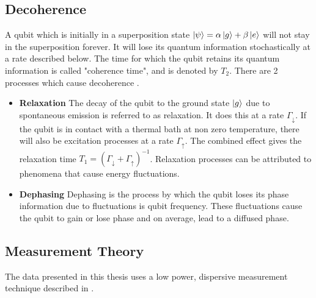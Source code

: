 \subsection{Decoherence}

A qubit which is initially in a superposition state $\ket{\psi} = \alpha\ket{g}+\beta\ket{e}$ will not stay in the superposition forever. It will lose its quantum information stochastically at a rate described below. The time for which the qubit retains its quantum information is called "coherence time", and is denoted by $T_2$. There are 2 processes which cause decoherence \cite{Geerlings2013}.
\begin{itemize}
\item \textbf{Relaxation}
The decay of the qubit to the ground state $\ket{g}$ due to spontaneous emission is referred to as relaxation. It does this at a rate $\Gamma_{\downarrow}$. If the qubit is in contact with a thermal bath at non zero temperature, there will also be excitation processes at a rate $\Gamma_{\uparrow}$. The combined effect gives the relaxation time $T_1 = \left(\Gamma_{\downarrow}+\Gamma_{\uparrow}\right)^{-1}$. Relaxation processes can be attributed to phenomena that cause energy fluctuations.
\item \textbf{Dephasing}
Dephasing is the process by which the qubit loses its phase information due to fluctuations is qubit frequency. These fluctuations cause the qubit to gain or lose phase and on average, lead to a diffused phase.
\end{itemize}

\subsection{Measurement Theory}

The data presented in this thesis uses a low power, dispersive measurement technique described in \cite{Bianchetti2009}.
